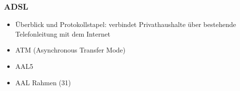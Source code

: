 \subsubsection{ADSL}
\begin{itemize}
\item Überblick und Protokollstapel: verbindet Privathaushalte über bestehende Telefonleitung mit dem Internet
\item ATM (Asynchronous Transfer Mode)
\item AAL5
\item AAL Rahmen (31)
\end{itemize}